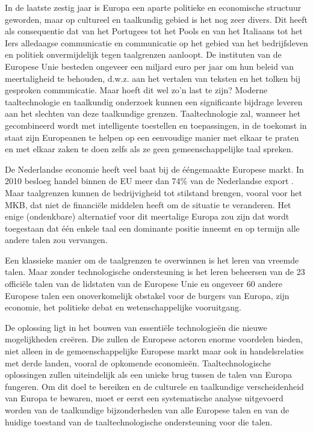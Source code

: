 \documentclass[]{../../metanetpaper}
\begin{document}
\begin{multicols}{2}

    In de laatste zestig jaar is Europa een aparte politieke en economische structuur geworden, maar op cultureel en taalkundig gebied is het nog zeer divers. Dit heeft als consequentie dat van het Portugees tot het Pools en van het Italiaans tot het Iers alledaagse communicatie en communicatie op het gebied van het bedrijfsleven en politiek onvermijdelijk tegen taalgrenzen aanloopt. De instituten van de Europese Unie besteden ongeveer een miljard euro per jaar om hun beleid van meertaligheid te behouden, d.w.z. aan het vertalen van teksten en het tolken bij gesproken communicatie. Maar hoeft dit wel zo'n last te zijn? Moderne taaltechnologie en taalkundig onderzoek kunnen een significante bijdrage leveren aan het slechten van deze taalkundige grenzen. Taaltechnologie zal, wanneer het gecombineerd wordt met intelligente toestellen en toepassingen, in de toekomst in staat zijn Europeanen te helpen op een eenvoudige manier met elkaar te praten en met elkaar zaken te doen zelfs als ze geen gemeenschappelijke taal spreken.


    De Nederlandse economie heeft veel baat bij de {\'e}{\'e}ngemaakte Europese markt. In 2010 besloeg handel binnen de EU meer dan 74\% van de Nederlandse export \cite{CBSStats}.  Maar taalgrenzen kunnen de bedrijvigheid tot stilstand brengen, vooral voor het MKB, dat niet de financi{\"e}le middelen heeft om de situatie te veranderen. Het enige (ondenkbare) alternatief voor dit meertalige Europa zou zijn dat wordt toegestaan dat {\'e}{\'e}n enkele taal een dominante positie inneemt en op termijn alle andere talen zou vervangen.

    Een klassieke manier om de taalgrenzen te overwinnen is het leren van vreemde talen. Maar zonder technologische ondersteuning is het leren beheersen van de 23 offici{\"e}le talen van de lidstaten van de Europese Unie en ongeveer 60 andere Europese talen een onoverkomelijk obstakel voor de burgers van Europa, zijn economie, het politieke debat en wetenschappelijke vooruitgang.

    De oplossing ligt in het bouwen van essenti{\"e}le technologie{\"e}n die nieuwe mogelijkheden cre{\"e}ren. Die zullen de Europese actoren enorme voordelen bieden, niet alleen in de gemeenschappelijke Europese markt maar ook in handelsrelaties met derde landen, vooral de opkomende economie{\"e}n. Taaltechnologische oplossingen zullen uiteindelijk als een unieke brug tussen de talen van Europa fungeren. Om dit doel te bereiken en de culturele en taalkundige verscheidenheid van Europa te bewaren, moet er eerst een systematische analyse uitgevoerd worden van de taalkundige bijzonderheden van alle Europese talen en van de huidige toestand van de taaltechnologische ondersteuning voor die talen.



\end{multicols}
\end{document}
